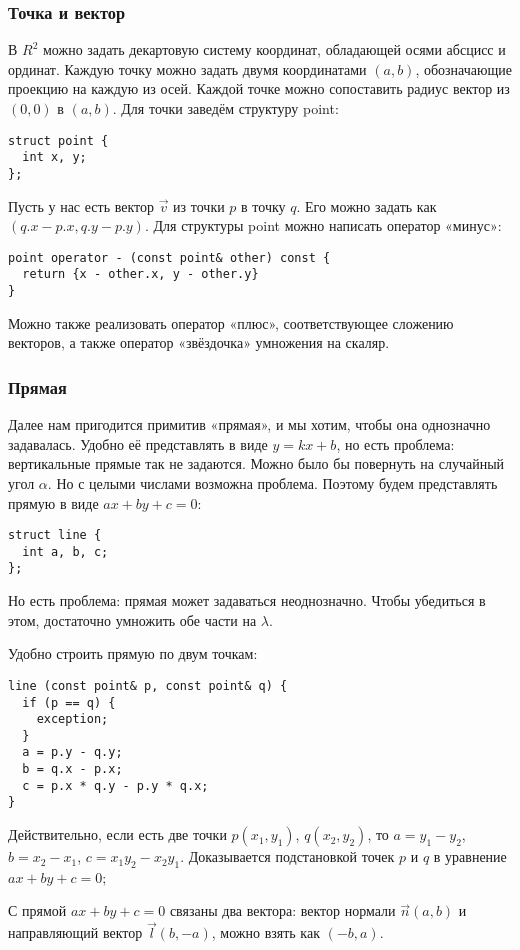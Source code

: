 
\subsubsection*{Точка и вектор}

В $R^2$ можно задать декартовую систему координат, обладающей осями абсцисс и ординат. Каждую точку можно задать двумя координатами $(a, b)$, обозначающие проекцию на каждую из осей. Каждой точке можно сопоставить радиус вектор из $(0, 0)$ в $(a, b)$. Для точки заведём структуру point:

\begin{lstlisting}
struct point {
  int x, y;
};
\end{lstlisting}


Пусть у нас есть вектор $\vec{v}$ из точки $p$ в точку $q$. Его можно задать как $(q.x - p.x, q.y - p.y)$. Для структуры point можно написать оператор «минус»:

\begin{lstlisting}
point operator - (const point& other) const {
  return {x - other.x, y - other.y}
}
\end{lstlisting}

Можно также реализовать оператор «плюс», соответствующее сложению векторов, а также оператор «звёздочка» умножения на скаляр.

\subsubsection*{Прямая}

Далее нам пригодится примитив «прямая», и мы хотим, чтобы она однозначно задавалась. Удобно её представлять в виде $y = kx + b$, но есть проблема: вертикальные прямые так не задаются. Можно было бы повернуть на случайный угол $\alpha$. Но с целыми числами возможна проблема. Поэтому будем представлять прямую в виде $ax + by + c = 0$:

\begin{lstlisting}
struct line {
  int a, b, c;
};
\end{lstlisting}

Но есть проблема: прямая может задаваться неоднозначно. Чтобы убедиться в этом, достаточно умножить обе части на $\lambda$. 

Удобно строить прямую по двум точкам:

\begin{lstlisting}
line (const point& p, const point& q) {
  if (p == q) {
    exception;
  }
  a = p.y - q.y;
  b = q.x - p.x;
  c = p.x * q.y - p.y * q.x;
}
\end{lstlisting}

Действительно, если есть две точки $p(x_1, y_1)$, $q(x_2, y_2)$, то $a = y_1 - y_2$, $b = x_2 - x_1$, $c = x_1 y_2 - x_2 y_1$. Доказывается подстановкой точек $p$ и $q$ в уравнение $ax + by + c = 0$;

С прямой $ax + by + c = 0$ связаны два вектора: вектор нормали $\vec{n} (a, b)$ и направляющий вектор $\vec{l} (b, -a)$, можно взять как $(-b, a)$. 
